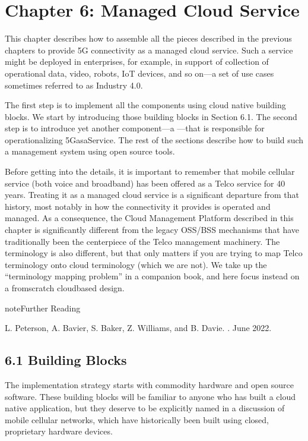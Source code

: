 \documentclass[a4paper,11pt,english]{sphinxmanual}
\begin{document}
\chapter{Chapter 6:  Managed Cloud Service}
\label{\detokenize{cloud:chapter-6-managed-cloud-service}}\label{\detokenize{cloud::doc}}
\sphinxAtStartPar
This chapter describes how to assemble all the pieces described in the
previous chapters to provide 5G connectivity as a managed cloud
service. Such a service might be deployed in enterprises, for example,
in support of collection of operational data, video, robots, IoT
devices, and so on—a set of use cases sometimes referred to as
Industry 4.0.

\sphinxAtStartPar
The first step is to implement all the components using cloud native
building blocks. We start by introducing those building blocks in
Section 6.1. The second step is to introduce yet another component—a
—that is responsible for operationalizing
5G\sphinxhyphen{}as\sphinxhyphen{}a\sphinxhyphen{}Service. The rest of the sections describe how to build such a
management system using open source tools.

\sphinxAtStartPar
Before getting into the details, it is important to remember that
mobile cellular service (both voice and broadband) has been offered as a
Telco service for 40 years. Treating it as a managed cloud service is
a significant departure from that history, most notably in how the
connectivity it provides is operated and managed. As a consequence,
the Cloud Management Platform described in this chapter is
significantly different from the legacy OSS/BSS mechanisms that have
traditionally been the centerpiece of the Telco management
machinery. The terminology is also different, but that only matters if
you are trying to map Telco terminology onto cloud terminology (which
we are not). We take up the “terminology mapping problem” in a
companion book, and here focus instead on a from\sphinxhyphen{}scratch cloud\sphinxhyphen{}based
design.

\label{\detokenize{cloud:reading-ops}}
\begin{sphinxadmonition}{note}{Further Reading}

\sphinxAtStartPar
L. Peterson, A. Bavier, S. Baker, Z. Williams, and B. Davie. . June 2022.
\end{sphinxadmonition}


\section{6.1 Building Blocks}
\label{\detokenize{cloud:building-blocks}}
\sphinxAtStartPar
The implementation strategy starts with commodity hardware and open
source software. These building blocks will be familiar to anyone who
has built a cloud native application, but they deserve to be
explicitly named in a discussion of mobile cellular networks, which
have historically been built using closed, proprietary hardware
devices.
\end{document}

